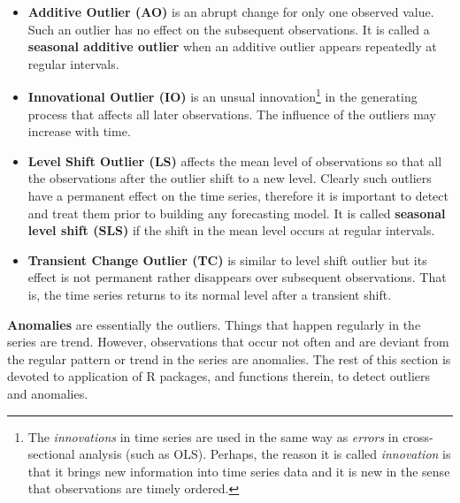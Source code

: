 \begin{itemize}[noitemsep]
\item \textbf{Additive Outlier (AO)} is an abrupt change for only one observed value. Such an outlier has no effect on the subsequent observations. It is called a \textbf{seasonal additive outlier} when an additive outlier appears repeatedly at regular intervals.
\item \textbf{Innovational Outlier (IO)} is an unsual innovation\footnote{The \textit{innovations} in time series are used in the same way as \textit{errors} in cross-sectional analysis (such as OLS). Perhaps, the reason it is called \textit{innovation} is that it brings new information into time series data and it is new in the sense that observations are timely ordered.} in the generating process that affects all later observations. The influence of the outliers may increase with time.
\item \textbf{Level Shift Outlier (LS)} affects the mean level of observations so that all the observations after the outlier shift to a new level. Clearly such outliers have a permanent effect on the time series, therefore it is important to detect and treat them prior to building any forecasting model. It is called \textbf{seasonal level shift (SLS)} if the shift in the mean level occurs at regular intervals.
\item \textbf{Transient Change Outlier (TC)} is similar to level shift outlier but its effect is not permanent rather disappears over subsequent observations. That is, the time series returns to its normal level after a transient shift.
\end{itemize}
\textbf{Anomalies} are essentially the outliers. Things that happen regularly in the series are trend. However, observations that occur not often and are deviant from the regular pattern or trend in the series are anomalies.
The rest of this section is devoted to application of R packages, and functions therein, to detect outliers and anomalies. 
